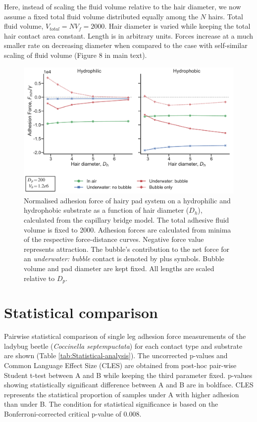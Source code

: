 \documentclass[english]{achemso}
\begin{document}
Here, instead of scaling the fluid volume relative to the hair diameter,
we now assume a fixed total fluid volume distributed equally among
the $N$ hairs. Total fluid volume, $V_{total}=NV_{f}=2000$. Hair
diameter is varied while keeping the total hair contact area constant.
Length is in arbitrary units. Forces increase at a much smaller rate
on decreasing diameter when compared to the case with self-similar
scaling of fluid volume (Figure 8 in main text).

\begin{figure}[H]
\includegraphics{FigureS3-Effect_of_hair_size(constant_vol)}

\caption{Normalised adhesion force of hairy pad system on a hydrophilic and
hydrophobic substrate as a function of hair diameter ($D_{h}$), calculated
from the capillary bridge model. The total adhesive fluid volume is
fixed to 2000. Adhesion forces are calculated from minima of the respective
force-distance curves. Negative force value represents attraction.
The bubble's contribution to the net force for an \emph{underwater:
bubble} contact is denoted by plus symbols. Bubble volume and pad
diameter are kept fixed. All lengths are scaled relative to $D_{p}$.}
\end{figure}


\section{Statistical comparison}

Pairwise statistical comparison of single leg adhesion force measurements
of the ladybug beetle (\emph{Coccinella septempuctata}) for each contact
type and substrate are shown (Table \ref{tab:Statistical-analysis}).
The uncorrected p-values and Common Language Effect Size (CLES) are
obtained from post-hoc pair-wise Student t-test between A and B while
keeping the third parameter fixed. p-values showing statistically
significant difference between A and B are in boldface. 
CLES represents the statistical proportion of samples under A with higher adhesion than under B. The condition
for statistical significance is based on the Bonferroni-corrected
critical p-value of 0.008.
\end{document}
